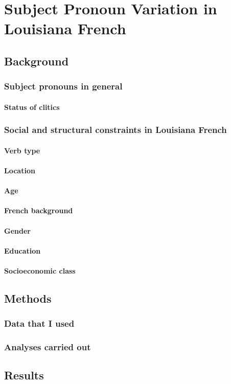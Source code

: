 \chapter{Subject Pronoun Variation in Louisiana French}
  \section{Background}
    \subsection{Subject pronouns in general}
      \subsubsection{Status of clitics}
    \subsection{Social and structural constraints in Louisiana French} %
      \subsubsection{Verb type}
      \subsubsection{Location}
      \subsubsection{Age}
      \subsubsection{French background}
      \subsubsection{Gender}
      \subsubsection{Education}
      \subsubsection{Socioeconomic class}
  \section{Methods}
    \subsection{Data that I used}
    \subsection{Analyses carried out}
  \section{Results}